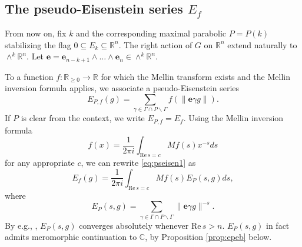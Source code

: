\documentclass[11pt]{amsart}
\def\R{\mathbb{R}}
\numberwithin{theorem}{section}
\numberwithin{equation}{section}
\theoremstyle{remark}
\theoremstyle{definition}
\newcommand{\C}{\mathbb{C}}
\newcommand{\re}{\mathrm{Re}\,}
\newcommand{\ga}{\mathfrak{a}}
\newcommand{\ve}{\mathbf{e}}
\begin{document}





\subsection{The pseudo-Eisenstein series $E_f$}

From now on, fix $k$ and the corresponding maximal parabolic $P = P(k)$ stabilizing the flag $0 \subseteq E_k \subseteq \R^n$. The right action of $G$ on $\R^n$ extend naturally to $\wedge^k\R^n$. Let $\ve= \ve_{n-k+1} \wedge \ldots \wedge \ve_n \in \wedge^k\R^n$.

To a function $f: \R_{\geq 0} \rightarrow \R$ for which the Mellin transform exists and the Mellin inversion formula applies,
we associate a pseudo-Eisenstein series
\begin{equation}\label{eq:pseisen1}
E_{P,f}(g) = \sum_{\gamma \in \Gamma \cap P \backslash \Gamma} f(\|\ve\gamma g\|).
\end{equation}
If $P$ is clear from the context, we write $E_{P,f} = E_f$.
Using the Mellin inversion formula
\begin{equation*}
f(x) = \frac{1}{2\pi i} \int_{\re s = c} Mf(s)x^{-s}ds
\end{equation*}
for any appropriate $c$, we can rewrite \eqref{eq:pseisen1} as
\begin{equation} \label{eq:pseisen2}
E_f(g) = \frac{1}{2\pi i} \int_{\re s = c} Mf(s) E_P(s,g) ds,
\end{equation}
where
\begin{equation} \label{eq:E_p}
E_P(s,g) = \sum_{\gamma \in \Gamma \cap P \backslash \Gamma} \|\ve\gamma g\|^{-s}.
\end{equation}
By e.g., \cite[Lemma 4.1]{Kim23}, $E_P(s,g)$ converges absolutely whenever $\re s > n$. $E_P(s,g)$ in fact admits meromorphic continuation to $\C$, by Proposition \ref{prop:epeb} below.
\end{document}
